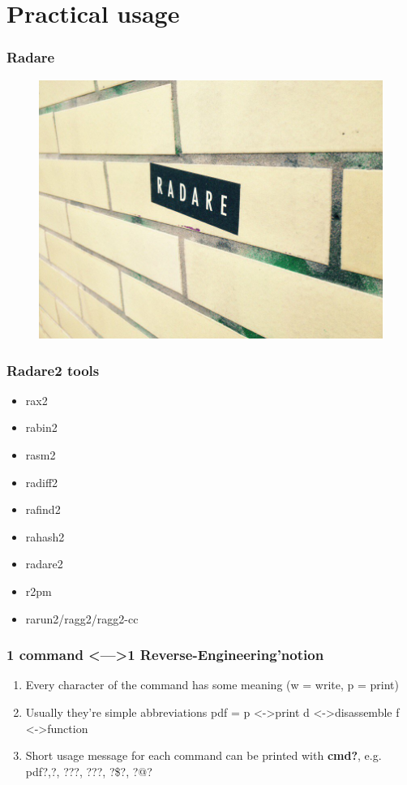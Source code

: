 \documentclass[10pt,pdf,utf8,english,compress,hyperref={unicode}]{beamer}
\begin{document}
\section{Practical usage}

\begin{frame}[fragile]
	\frametitle{Radare}
	\begin{figure}
		\includegraphics[scale=0.2]{r2-ubahn.jpg}
	\end{figure}
\end{frame}

\begin{frame}[fragile]
  \frametitle{Radare2 tools}
     \begin{itemize}
        \item rax2
        \item rabin2
        \item rasm2
        \item radiff2
        \item rafind2
        \item rahash2
        \item radare2
        \item r2pm
        \item rarun2/ragg2/ragg2-cc
      \end{itemize}
\end{frame}

\begin{frame}[fragile]
  \frametitle{1 command \textless—\textgreater 1 Reverse-Engineering'notion}
  \begin{enumerate}
  \item Every character of the command has some meaning \alert{(w = write, p = print)}
  \item Usually they're simple abbreviations \alert{pdf = p \textless-\textgreater print d \textless-\textgreater disassemble f \textless-\textgreater function }
  \item Short usage message for each command can be printed with \textbf{cmd?}, e.g. \alert{pdf?},\alert{?}, \alert{???}, \alert{???}, \alert{?\$?}, \alert{?@?}
  \end{enumerate}
\end{frame}
\end{document}
